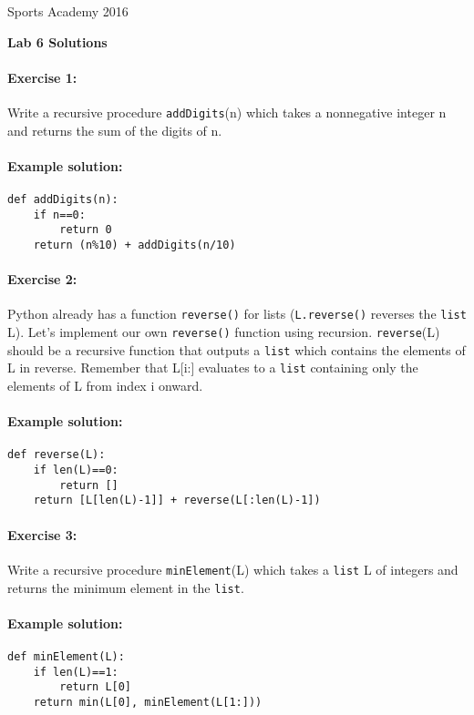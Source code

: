 \documentclass[11pt]{article}
\newlength{\toppush}
\newcommand{\htitle}[2]{\noindent\vspace*{-\toppush}\newline\parbox{6.5in}
 {\large Sports Academy \hfill #1\newline
\hspace*{\fill}{\bf Algorithms and Programming for High Schoolers} \hspace*{\fill} \newline
\mbox{}\hrulefill\mbox{}}\vspace*{1ex}\mbox{}\newline
\begin{center}{\Large\bf #2}\end{center}}
\begin{document}
\htitle{2016}{Lab 6 Solutions}

\paragraph{Exercise 1:}
Write a recursive procedure \texttt{addDigits}(n) which takes a
nonnegative integer n and returns the sum of the digits of n.

\paragraph{Example solution:}
\begin{verbatim}
def addDigits(n):
    if n==0:
        return 0
    return (n%10) + addDigits(n/10)
\end{verbatim}

\paragraph{Exercise 2:}
Python already has a function \texttt{reverse()} for lists
(\texttt{L.reverse()} reverses the \texttt{list} L).  Let's implement
our own \texttt{reverse()} function using recursion.
\texttt{reverse}(L) should be a recursive function that outputs a
\texttt{list} which contains the elements of L in reverse. Remember
that L[i:] evaluates to a \texttt{list} containing only the elements
of L from index i onward.

\paragraph{Example solution:}
\begin{verbatim}
def reverse(L):
    if len(L)==0:
        return []
    return [L[len(L)-1]] + reverse(L[:len(L)-1])
\end{verbatim}

\paragraph{Exercise 3:}
Write a recursive procedure \texttt{minElement}(L) which takes a
\texttt{list}  L of integers and returns the minimum element in the
\texttt{list}.

\paragraph{Example solution:}
\begin{verbatim}
def minElement(L):
    if len(L)==1:
        return L[0]
    return min(L[0], minElement(L[1:]))
\end{verbatim}
\end{document}
